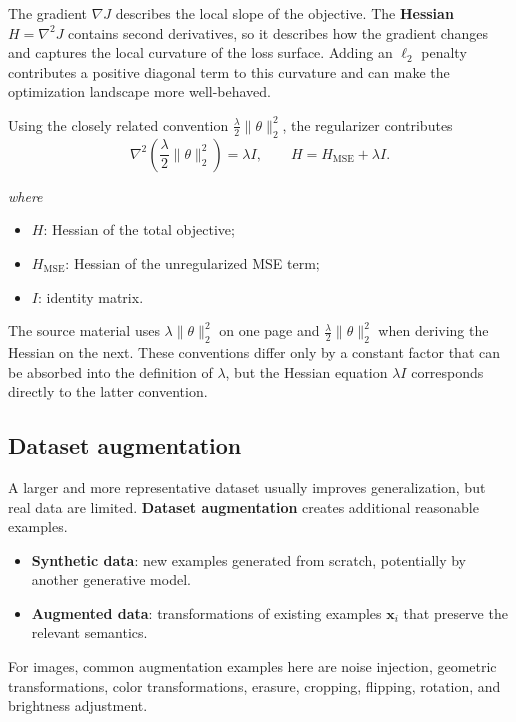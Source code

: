 \documentclass[11pt,a4paper]{report}
\newcommand{\vect}[1]{\bm{#1}}
\newcommand{\wherelegend}{\par\smallskip\textit{where}\vspace{-0.3em}}
\begin{document}
The gradient $\nabla J$ describes the local slope of the objective. The \textbf{Hessian} $H=\nabla^2J$ contains second derivatives, so it describes how the gradient changes and captures the local curvature of the loss surface. Adding an $\ell_2$ penalty contributes a positive diagonal term to this curvature and can make the optimization landscape more well-behaved.

Using the closely related convention $\frac{\lambda}{2}\lVert\theta\rVert_2^2$, the regularizer contributes
\begin{equation}
  \nabla^2\!\left(\frac{\lambda}{2}\lVert\theta\rVert_2^2\right)=\lambda I,
  \qquad
  H = H_{\mathrm{MSE}} + \lambda I.
  \label{eq:weight-decay-hessian}
\end{equation}
\wherelegend
\begin{itemize}
  \item $H$: Hessian of the total objective;
  \item $H_{\mathrm{MSE}}$: Hessian of the unregularized MSE term;
  \item $I$: identity matrix.
\end{itemize}

\begin{remarkbox}[title={Source-notation consistency}]
The source material uses $\lambda\lVert\theta\rVert_2^2$ on one page and $\frac{\lambda}{2}\lVert\theta\rVert_2^2$ when deriving the Hessian on the next. These conventions differ only by a constant factor that can be absorbed into the definition of $\lambda$, but the Hessian equation $\lambda I$ corresponds directly to the latter convention.
\end{remarkbox}

\subsection{Dataset augmentation}

A larger and more representative dataset usually improves generalization, but real data are limited. \textbf{Dataset augmentation} creates additional reasonable examples.
\begin{itemize}
  \item \textbf{Synthetic data}: new examples generated from scratch, potentially by another generative model.
  \item \textbf{Augmented data}: transformations of existing examples $\vect{x}_i$ that preserve the relevant semantics.
\end{itemize}
For images, common augmentation examples here are noise injection, geometric transformations, color transformations, erasure, cropping, flipping, rotation, and brightness adjustment.
\end{document}
